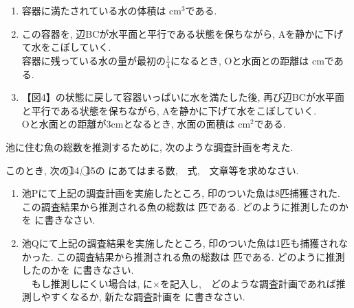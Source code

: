\documentclass[dvipdfmx, titlepage, 11pt]{jsarticle}
\begin{document}
\begin{enumerate}[(1)]
\item 容器に満たされている水の体積は  cm${}^{3}$である.\\[2cm]
\item この容器を, 辺BCが水平面と平行である状態を保ちながら, Aを静かに下げて水をこぼしていく.\\[0.1cm]
  容器に残っている水の量が最初の$\displaystyle \frac{1}{4}$になるとき, Oと水面との距離は  cmである.\\[2cm]
\item 【図4】の状態に戻して容器いっぱいに水を満たした後, 再び辺BCが水平面と平行である状態を保ちながら, Aを静かに下げて水をこぼしていく.\\
  Oと水面との距離が3cmとなるとき, 水面の面積は cm${}^{2}$である.
\end{enumerate}
\newpage

\noindent {}\hspace{10pt} 池に住む魚の総数を推測するために, 次のような調査計画を考えた.
\begin{center}
\end{center}

このとき, 次の\textcircled{\scriptsize 14}, \textcircled{\scriptsize 15}の \fbox{　\hspace{10pt} } にあてはまる数,\ \ 式,\ \ 文章等を求めなさい.
\begin{enumerate}[(1)]
\item 池Pにて上記の調査計画を実施したところ, 印のついた魚は8匹捕獲された. この調査結果から推測される魚の総数は  匹である. どのように推測したのかを  に書きなさい.\\[5cm]
\item 池Qにて上記の調査結果を実施したところ, 印のついた魚は1匹も捕獲されなかった. この調査結果から推測される魚の総数は  匹である. どのように推測したのかを  に書きなさい.\\

  　もし推測しにくい場合は,  に$\times$を記入し,\ \ どのような調査計画であれば推測しやすくなるか, 新たな調査計画を  に書きなさい.
\end{enumerate}

\newpage
\thispagestyle{empty}
　
\newpage

\newpage
\thispagestyle{empty}
　
\newpage
\end{document}

